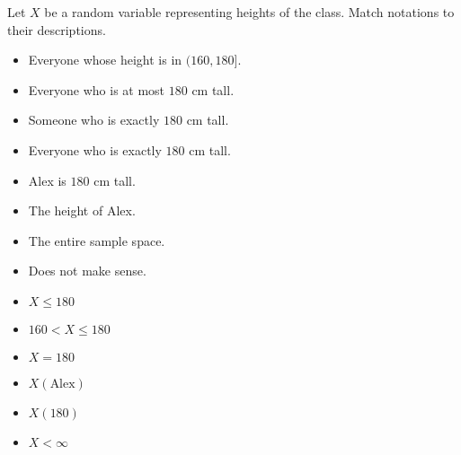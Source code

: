 \documentclass[../main.tex]{subfiles}
\begin{document}
\begin{example}
  Let \(X\) be a random variable representing heights of the class.  Match notations to their descriptions. 

  \begin{multicols}{2}
   \begin{itemize}
      \item Everyone whose height is in \((160, 180]\).
      \item Everyone who is at most \(180\) cm tall.
      \item Someone who is exactly \(180\) cm tall.
      \item Everyone who is exactly \(180\) cm tall.
      \item Alex is \(180\) cm tall.
      \item The height of Alex.
      \item The entire sample space.
      \item Does not make sense. 
    \end{itemize} 
    \columnbreak
    \begin{itemize}
      \item \(X \le 180\)
      \item \(160 < X \le 180\)
      \item \(X = 180\)
      \item \(X(\text{Alex})\)
      \item \(X(180)\)
      \item \( X < \infty\)
    \end{itemize}
  \end{multicols}
\end{example}
\end{document}
